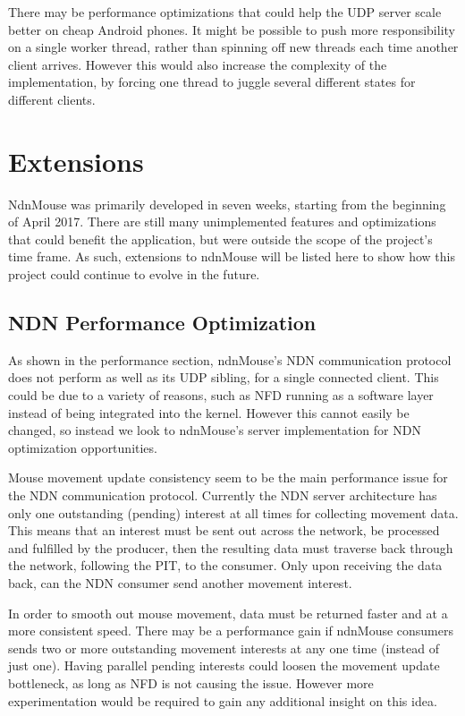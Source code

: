 \documentclass{sig-alternate}
\renewcommand\_{\textunderscore\allowbreak}  %
\begin{document}
There may be performance optimizations that could help the UDP server scale better on cheap Android phones. It might be possible to push more responsibility on a single worker thread, rather than spinning off new threads each time another client arrives. However this would also increase the complexity of the implementation, by forcing one thread to juggle several different states for different clients.  \\ %

\section{Extensions}
\label{sec:extensions}
NdnMouse was primarily developed in seven weeks, starting from the beginning of April 2017. There are still many unimplemented features and optimizations that could benefit the application, but were outside the scope of the project's time frame. As such, extensions to ndnMouse will be listed here to show how this project could continue to evolve in the future.

\subsection{NDN Performance Optimization}
As shown in the performance section, ndnMouse's NDN communication protocol does not perform as well as its UDP sibling, for a single connected client. This could be due to a variety of reasons, such as NFD running as a software layer instead of being integrated into the kernel. However this cannot easily be changed, so instead we look to ndnMouse's server implementation for NDN optimization opportunities.

Mouse movement update consistency seem to be the main performance issue for the NDN communication protocol. Currently the NDN server architecture has only one outstanding (pending) interest at all times for collecting movement data. This means that an interest must be sent out across the network, be processed and fulfilled by the producer, then the resulting data must traverse back through the network, following the PIT, to the consumer. Only upon receiving the data back, can the NDN consumer send another movement interest.

In order to smooth out mouse movement, data must be returned faster and at a more consistent speed. There may be a performance gain if ndnMouse consumers sends two or more outstanding movement interests at any one time (instead of just one). Having parallel pending interests could loosen the movement update bottleneck, as long as NFD is not causing the issue. However more experimentation would be required to gain any additional insight on this idea.
\end{document}

